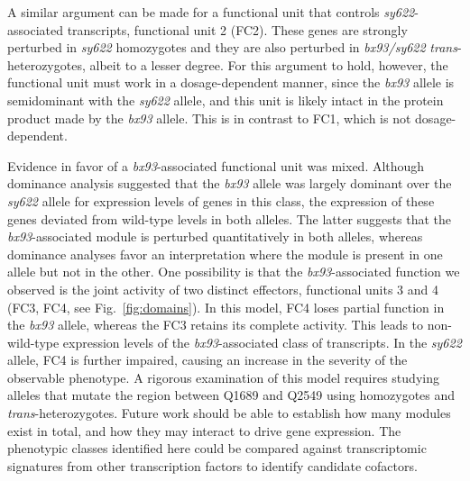 \documentclass[10pt, twocolumn]{article}
\begin{document}
A similar argument can be made for a functional unit that controls
\emph{sy622}-associated transcripts, functional unit 2 (FC2). These genes are
strongly perturbed in \emph{sy622} homozygotes and they are also perturbed in
\emph{bx93/sy622} \emph{trans}-heterozygotes, albeit to a lesser degree. For
this argument to hold, however, the functional unit must work in a
dosage-dependent manner, since the \emph{bx93} allele is semidominant with the
\emph{sy622} allele, and this unit is likely intact in the protein product made
by the \emph{bx93} allele. This is in contrast to FC1, which is not
dosage-dependent.

Evidence in favor of a \emph{bx93}-associated functional unit was mixed.
Although dominance analysis suggested that the \emph{bx93} allele was largely
dominant over the \emph{sy622} allele for expression levels of genes in this
class, the expression of these genes deviated from wild-type levels in both
alleles. The latter suggests that the \emph{bx93}-associated module is perturbed
quantitatively in both alleles, whereas dominance analyses favor an
interpretation where the module is present in one allele but not in the other.
One possibility is that the \emph{bx93}-associated function we observed is the
joint activity of two distinct effectors, functional units 3 and 4 (FC3, FC4,
see Fig.~\ref{fig:domains}). In this model, FC4 loses partial function in the
\emph{bx93} allele, whereas the FC3 retains its complete activity. This leads to
non-wild-type expression levels of the \emph{bx93}-associated class of
transcripts. In the \emph{sy622} allele, FC4 is further impaired, causing an
increase in the severity of the observable phenotype. A rigorous examination of
this model requires studying alleles that mutate the region between Q1689 and
Q2549 using homozygotes and \emph{trans}-heterozygotes. Future work should be
able to establish how many modules exist in total, and how they may
interact to drive gene expression. The phenotypic classes identified here could
be compared against transcriptomic signatures from other transcription factors
to identify candidate cofactors.
\end{document}
